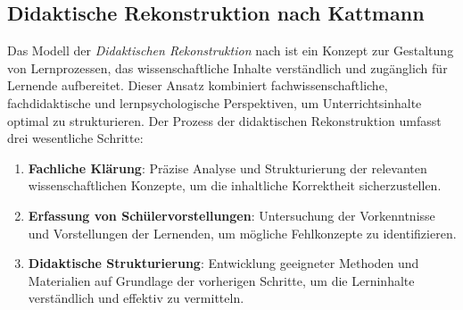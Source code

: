 %
%


\bip\bip
\subsection{Didaktische Rekonstruktion nach Kattmann}

Das Modell der \textit{Didaktischen Rekonstruktion} nach \textcite{Kattmann} ist ein Konzept zur Gestaltung von Lernprozessen, das wissenschaftliche Inhalte verst\"{a}ndlich und zug\"{a}nglich f\"{u}r Lernende aufbereitet. Dieser Ansatz kombiniert fachwissenschaftliche, fachdidaktische und lernpsychologische Perspektiven, um Unterrichtsinhalte optimal zu strukturieren.
\bip
Der Prozess der didaktischen Rekonstruktion umfasst drei wesentliche Schritte:
\begin{enumerate}
    \item \textbf{Fachliche Kl\"{a}rung}: Pr\"{a}zise Analyse und Strukturierung der relevanten wissenschaftlichen Konzepte, um die inhaltliche Korrektheit sicherzustellen.
    \item \textbf{Erfassung von Sch\"{u}lervorstellungen}: Untersuchung der Vorkenntnisse und Vorstellungen der Lernenden, um m\"{o}gliche Fehlkonzepte zu identifizieren.
    \item \textbf{Didaktische Strukturierung}: Entwicklung geeigneter Methoden und Materialien auf Grundlage der vorherigen Schritte, um die Lerninhalte verst\"{a}ndlich und effektiv zu vermitteln.
\end{enumerate}

